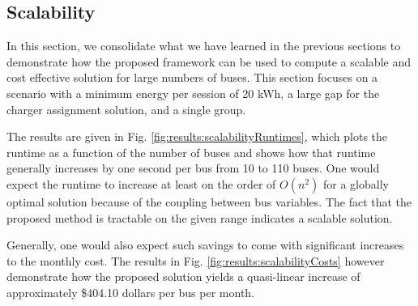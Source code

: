 \subsection{Scalability}
In this section, we consolidate what we have learned in the previous sections to demonstrate how the proposed framework can be used to compute a scalable and cost effective solution for large numbers of buses. This section focuses on a scenario with a minimum energy per session of 20 kWh, a large gap for the charger assignment solution, and a single group.
\par The results are given in Fig. \ref{fig:results:scalabilityRuntimes}, which plots the runtime as a function of the number of buses and shows how that runtime generally increases by one second per bus from 10 to 110 buses.  One would expect the runtime to increase at least on the order of $O(n^2)$ for a globally optimal solution because of the coupling between bus variables. The fact that the proposed method is tractable on the given range indicates a scalable solution. 
\par Generally, one would also expect such savings to come with significant increases to the monthly cost. The results in Fig. \ref{fig:results:scalabilityCosts} however demonstrate how the proposed solution yields a quasi-linear increase of approximately \$404.10 dollars per bus per month. 


	
	
